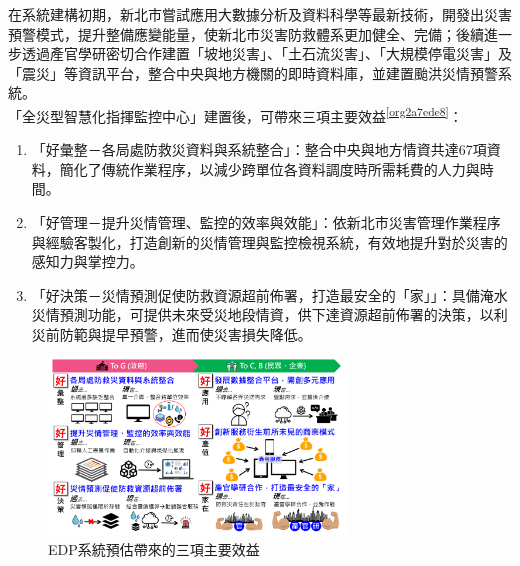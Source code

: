 \documentclass[a4paper,12pt]{article}
\begin{document}
\begin{enumerate}
\begin{enumerate}
在系統建構初期，新北市嘗試應用大數據分析及資料科學等最新技術，開發出災害預警模式，提升整備應變能量，使新北市災害防救體系更加健全、完備；後續進一步透過產官學研密切合作建置「坡地災害」、「土石流災害」、「大規模停電災害」及「震災」等資訊平台，整合中央與地方機關的即時資料庫，並建置颱洪災情預警系統。\\

「全災型智慧化指揮監控中心」建置後，可帶來三項主要效益\textsuperscript{\ref{org2a7ede8}}：\\
\begin{enumerate}
\item 「好彙整－各局處防救災資料與系統整合」：整合中央與地方情資共達67項資料，簡化了傳統作業程序，以減少跨單位各資料調度時所需耗費的人力與時間。\\
\item 「好管理－提升災情管理、監控的效率與效能」：依新北市災害管理作業程序與經驗客製化，打造創新的災情管理與監控檢視系統，有效地提升對於災害的感知力與掌控力。\\
\item 「好決策－災情預測促使防救資源超前佈署，打造最安全的「家」」：具備淹水災情預測功能，可提供未來受災地段情資，供下達資源超前佈署的決策，以利災前防範與提早預警，進而使災害損失降低。\\
\end{enumerate}

\begin{figure}[htbp]
\centering
\includegraphics[width=300]{images/aaron1.png}
\caption{\label{fig:FigName}EDP系統預估帶來的三項主要效益}
\end{figure}


\end{enumerate}
\end{enumerate}
\end{document}
